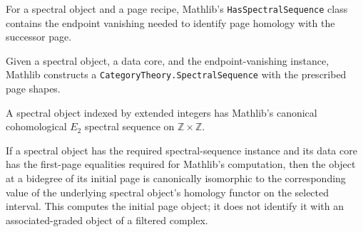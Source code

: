 \begin{definition}
  \label{def:mathlib-has-spectral-sequence}
  \mathlibok
  For a spectral object and a page recipe, Mathlib's
  \texttt{HasSpectralSequence} class contains the endpoint vanishing needed to
  identify page homology with the successor page.
\end{definition}

\begin{definition}
  \label{def:mathlib-spectral-object-spectral-sequence}
  \mathlibok
  Given a spectral object, a data core, and the endpoint-vanishing instance,
  Mathlib constructs a \texttt{CategoryTheory.SpectralSequence} with the
  prescribed page shapes.
\end{definition}

\begin{definition}
  \label{def:mathlib-e2-spectral-sequence}
  \mathlibok
  A spectral object indexed by extended integers has Mathlib's canonical
  cohomological $E_2$ spectral sequence on $\mathbb Z\times\mathbb Z$.
\end{definition}

\begin{definition}
  \label{def:mathlib-spectral-sequence-first-page}
  \mathlibok
  If a spectral object has the required spectral-sequence instance and its
  data core has the first-page equalities required for Mathlib's computation,
  then the object at a bidegree of its initial page is canonically isomorphic
  to the corresponding value of the underlying spectral object's homology
  functor on the selected interval.  This computes the initial page object; it
  does not identify it with an associated-graded object of a filtered complex.
\end{definition}

